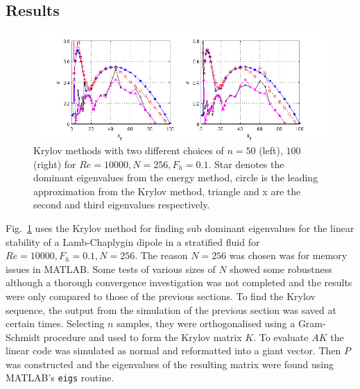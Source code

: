 \subsection{Results}
\begin{figure}
\begin{center}
\includegraphics[scale=0.7]{final_data.png}
\caption{Krylov methods with two different choices of $n=50$  (left), $100$ (right) for $Re=10000, N=256, F_{h}=0.1$. Star denotes the dominant eigenvalues from the energy method, circle is the leading approximation from the Krylov method, triangle and x are the second and third eigenvalues respectively.}
\label{krylov_tests}
\end{center} 
\end{figure}
Fig.~\ref{krylov_tests} uses the Krylov method for finding sub dominant eigenvalues for the linear stability of a Lamb-Chaplygin dipole in a stratified fluid for $Re=10000, F_{h}=0.1, N=256$. The reason $N=256$ was chosen was for memory issues in MATLAB. Some tests of various sizes of $N$ showed some robustness although a thorough convergence investigation was not completed and the results were only compared to those of the previous sections. To find the Krylov sequence, the output from the simulation of the previous section was saved at certain times.  Selecting $n$ samples, they were orthogonalised using a Gram-Schmidt procedure  and used to form the Krylov matrix $K$. To evaluate $AK$ the linear code was simulated as normal and reformatted into a giant vector. Then $P$ was constructed and the eigenvalues of the resulting matrix were found using MATLAB's \texttt{eigs} routine. 

